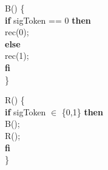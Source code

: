 \documentclass[\main/ApuntesPL.tex]{subfiles}
\begin{document}
\begin{center}
      \begin{minipage}{.5\textwidth}
        B() \{\\
        \hspace*{5mm}\textbf{if} sigToken == 0 \textbf{then}\\
        \hspace*{10mm}rec(0);\\
        \hspace*{5mm}\textbf{else}\\
        \hspace*{10mm}rec(1);\\
        \hspace*{5mm}\textbf{fi}\\
        \}
      \end{minipage}%
      \begin{minipage}{.5\textwidth}
        R() \{\\
        \hspace*{5mm}\textbf{if} sigToken $\in$ \{0,1\} \textbf{then}\\
        \hspace*{10mm}B();\\
        \hspace*{10mm}R();\\
        \hspace*{5mm}\textbf{fi}\\
        \}
      \end{minipage}
    \end{center}
\end{document}

